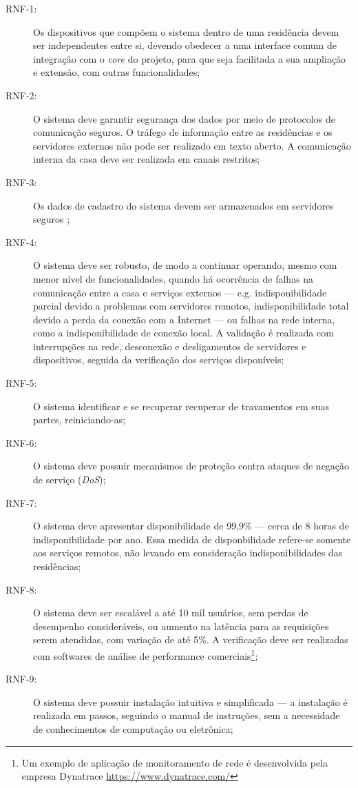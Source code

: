 \begin{description}
\item[RNF-1:]  Os dispositivos que compõem o sistema dentro de uma residência devem ser independentes entre si, devendo obedecer a uma interface comum de integração com o \emph{core} do projeto, para que seja facilitada a sua ampliação e extensão, com outras funcionalidades;
\item[RNF-2:]  O sistema deve garantir segurança dos dados por meio de protocolos de comunicação seguros. O tráfego de informação entre as residências e os servidores externos não pode ser realizado em texto aberto. A comunicação interna da casa deve ser realizada em canais restritos;
\item[RNF-3:]  Os dados de cadastro do sistema devem ser armazenados em servidores seguros \cite{softwareSecurity};
\item[RNF-4:]  O sistema deve ser robusto, de modo a continuar operando, mesmo com menor nível de funcionalidades, quando há ocorrência de falhas na comunicação entre a casa e serviços externos --- e.g. indisponibilidade parcial devido a problemas com servidores remotos, indisponibilidade total devido a perda da conexão com a Internet --- ou falhas na rede interna, como a indisponibilidade de conexão local. A validação é realizada com interrupções na rede, desconexão e desligamentos de servidores e dispositivos, seguida da verificação dos serviços disponíveis;
\item[RNF-5:] O sistema identificar e se recuperar recuperar de travamentos em suas partes, reiniciando-as;
\item[RNF-6:] O sistema deve possuir mecanismos de proteção contra ataques de negação de serviço (\emph{DoS});
\item[RNF-7:]  O sistema deve apresentar disponibilidade de 99,9\% --- cerca de 8 horas de indisponibilidade por ano. Essa medida de disponbilidade refere-se somente aos serviços remotos, não levando em consideração indisponibilidades das residências;
\item[RNF-8:]  O sistema deve ser escalável a até 10 mil usuários, sem perdas de desempenho consideráveis, ou aumento na latência para as requisições serem atendidas, com variação de até 5\%. A verificação deve ser realizadas com softwares de análise de performance comerciais\footnote{Um exemplo de aplicação de monitoramento de rede é desenvolvida pela empresa Dynatrace \url{https://www.dynatrace.com/}};
\item[RNF-9:]  O sistema deve possuir instalação intuitiva e simplificada --- a instalação é realizada em passos, seguindo o manual de instruções, sem a necessidade de conhecimentos de computação ou eletrônica;
\end{description}

